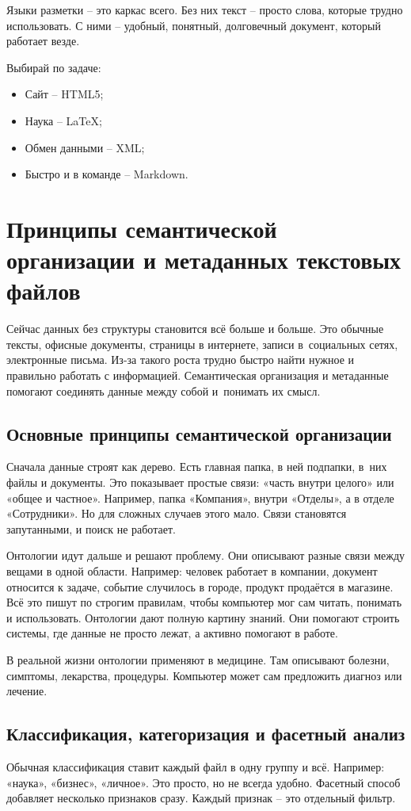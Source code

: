 \documentclass{ou}
\begin{document}
Языки разметки -- это каркас всего. Без них текст -- просто слова, которые трудно использовать. С ними -- удобный, понятный, долговечный документ, который работает везде.

Выбирай по задаче:
\begin{itemize}[label=-, leftmargin=0em, itemindent=3.35em, nosep]
\item Сайт -- HTML5;
\item Наука -- LaTeX;
\item Обмен данными -- XML;
\item Быстро и в команде -- Markdown.
\end{itemize}
\newpage
\section{Принципы семантической организации и метаданных текстовых файлов}
Сейчас данных без структуры становится всё больше и больше. Это обычные тексты, офисные документы, страницы в интернете, записи в~социальных сетях, электронные письма. Из-за такого роста трудно быстро найти нужное и правильно работать с информацией. Семантическая организация и метаданные помогают соединять данные между собой и~понимать их смысл. 
\subsection{Основные принципы семантической организации}
Сначала данные строят как дерево. Есть главная папка, в ней подпапки, в~них файлы и документы. Это показывает простые связи: «часть внутри целого» или «общее и частное». Например, папка «Компания», внутри «Отделы», а в отделе «Сотрудники». Но для сложных случаев этого мало. Связи становятся запутанными, и поиск не работает.

Онтологии идут дальше и решают проблему. Они описывают разные связи между вещами в одной области. Например: человек работает в компании, документ относится к задаче, событие случилось в городе, продукт продаётся в магазине. Всё это пишут по строгим правилам, чтобы компьютер мог сам читать, понимать и использовать. Онтологии дают полную картину знаний. Они помогают строить системы, где данные не просто лежат, а активно помогают в работе.

В реальной жизни онтологии применяют в медицине. Там описывают болезни, симптомы, лекарства, процедуры. Компьютер может сам предложить диагноз или лечение. 
\subsection{Классификация, категоризация и фасетный анализ}
Обычная классификация ставит каждый файл в одну группу и всё. Например: «наука», «бизнес», «личное». Это просто, но не всегда удобно. Фасетный способ добавляет несколько признаков сразу. Каждый признак -- это отдельный фильтр.
\end{document}
